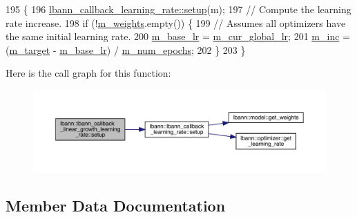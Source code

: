 \begin{DoxyCode}
195                                                                \{
196   \hyperlink{classlbann_1_1lbann__callback__learning__rate_a501f31a6b8fde1282a60e4b347e8d9d3}{lbann\_callback\_learning\_rate::setup}(m);
197   \textcolor{comment}{// Compute the learning rate increase.}
198   \textcolor{keywordflow}{if} (!\hyperlink{classlbann_1_1lbann__callback__learning__rate_a0b02e82190e04a22ab26d858041915d7}{m\_weights}.empty()) \{
199     \textcolor{comment}{// Assumes all optimizers have the same initial learning rate.}
200     \hyperlink{classlbann_1_1lbann__callback__linear__growth__learning__rate_a2fe23a59744da5c0c737eb9d301bc23b}{m\_base\_lr} = \hyperlink{classlbann_1_1lbann__callback__learning__rate_a97194f282c29a748c915d9811a8a99fb}{m\_cur\_global\_lr};
201     \hyperlink{classlbann_1_1lbann__callback__linear__growth__learning__rate_ad68e1fbbe86eb692cf26d0d4a452c469}{m\_inc} = (\hyperlink{classlbann_1_1lbann__callback__linear__growth__learning__rate_a56cc1954ef76d494c4b5d5074c326fca}{m\_target} - \hyperlink{classlbann_1_1lbann__callback__linear__growth__learning__rate_a2fe23a59744da5c0c737eb9d301bc23b}{m\_base\_lr}) / \hyperlink{classlbann_1_1lbann__callback__linear__growth__learning__rate_ac583819b3ee7fad93b9b96b44dfb4307}{m\_num\_epochs};
202   \}
203 \}
\end{DoxyCode}
Here is the call graph for this function\+:\nopagebreak
\begin{figure}[H]
\begin{center}
\leavevmode
\includegraphics[width=350pt]{classlbann_1_1lbann__callback__linear__growth__learning__rate_afaa81836e0dc1b6220212dad52df25fc_cgraph}
\end{center}
\end{figure}


\subsection{Member Data Documentation}
\mbox{\label{classlbann_1_1lbann__callback__linear__growth__learning__rate_a2fe23a59744da5c0c737eb9d301bc23b}} 
